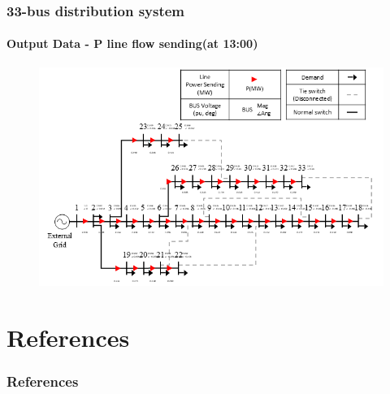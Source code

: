 \documentclass[
	11pt, %
	aspectratio=169, %
]{beamer}
\begin{document}
\begin{frame}
	\frametitle{33-bus distribution system}
	\framesubtitle{Output Data - P line flow sending(at 13:00)}

	\begin{figure}
		\includegraphics[width=4 in,keepaspectratio]{modified_33_bus_line_flow.png}
	\end{figure}

\end{frame}





	

\section{References}


\begin{frame} %
	\frametitle{References}
	
	\printbibliography
	
	
\end{frame}
\end{document}
